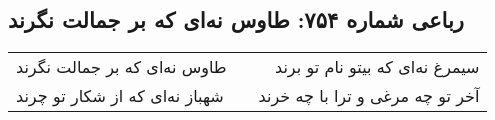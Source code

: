 \begin{center}
\section*{رباعی شماره ۷۵۴: طاوس نه‌ای که بر جمالت نگرند}
\label{sec:0754}
\begin{longtable}{l p{0.5cm} r}
طاوس نه‌ای که بر جمالت نگرند
&&
سیمرغ نه‌ای که بیتو نام تو برند
\\
شهباز نه‌ای که از شکار تو چرند
&&
آخر تو چه مرغی و ترا با چه خرند
\\
\end{longtable}
\end{center}
